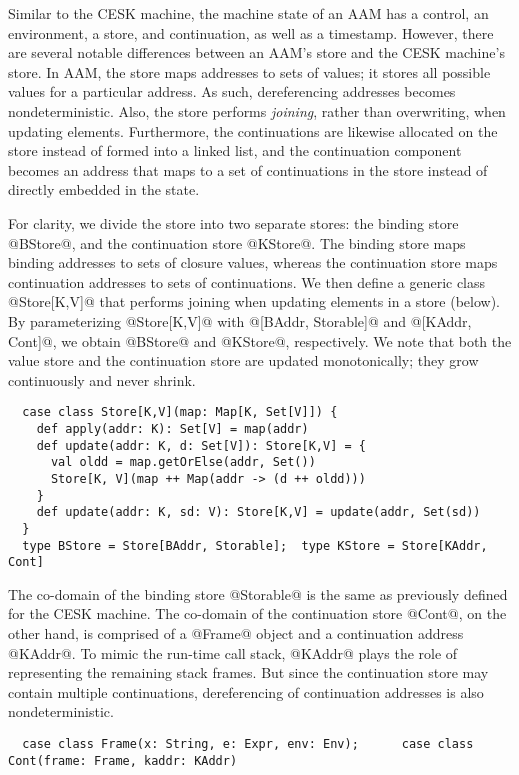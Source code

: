 \documentclass[acmsmall, screen]{acmart}\settopmatter{}
\begin{document}
Similar to the CESK machine, the machine state of an AAM has a control, an environment, a store,
and continuation, as well as a timestamp. However, there are several notable differences
between an AAM's store and the CESK machine's store. In AAM, the store maps addresses to sets of
values; it stores all possible values for a particular address. As such, dereferencing
addresses becomes nondeterministic. Also, the store performs \emph{joining}, rather than
overwriting, when updating elements. Furthermore, the continuations are likewise allocated
on the store instead of formed into a linked list, and the continuation component becomes
an address that maps to a set of continuations in the store instead of directly embedded
in the state.

For clarity, we divide the store into two separate stores: the binding store @BStore@, and
the continuation store @KStore@.
The binding store maps binding addresses to sets of closure values, whereas the continuation
store maps continuation addresses to sets of continuations.
We then define a generic class @Store[K,V]@ that performs joining when updating elements
in a store (below). By parameterizing @Store[K,V]@ with @[BAddr, Storable]@ and
@[KAddr, Cont]@, we obtain @BStore@ and @KStore@, respectively.
We note that both the value store and the continuation store are updated monotonically;
they grow continuously and never shrink.

\begin{lstlisting}
  case class Store[K,V](map: Map[K, Set[V]]) {
    def apply(addr: K): Set[V] = map(addr)
    def update(addr: K, d: Set[V]): Store[K,V] = {
      val oldd = map.getOrElse(addr, Set())
      Store[K, V](map ++ Map(addr -> (d ++ oldd)))
    }
    def update(addr: K, sd: V): Store[K,V] = update(addr, Set(sd))
  }
  type BStore = Store[BAddr, Storable];  type KStore = Store[KAddr, Cont]
\end{lstlisting}

The co-domain of the binding store @Storable@ is the same as previously defined for the CESK
machine. The co-domain of the continuation store @Cont@, on the other hand, is comprised of
a @Frame@ object and a continuation address @KAddr@. To mimic the run-time call stack,
@KAddr@ plays the role of representing the remaining stack frames.
But since the continuation store may contain multiple continuations, dereferencing
of continuation addresses is also nondeterministic.

\begin{lstlisting}
  case class Frame(x: String, e: Expr, env: Env);      case class Cont(frame: Frame, kaddr: KAddr)
\end{lstlisting}
\end{document}
